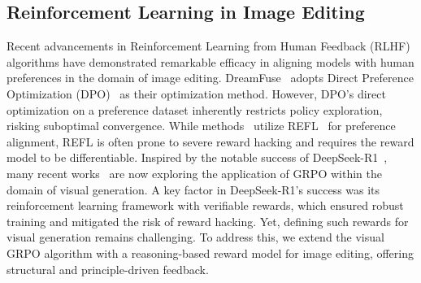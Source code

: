 \subsection{Reinforcement Learning in Image Editing}
Recent advancements in Reinforcement Learning from Human Feedback (RLHF) algorithms have demonstrated remarkable efficacy in aligning models with human preferences in the domain of image editing. 
DreamFuse~\citep{huang2025dreamfuse} adopts Direct Preference Optimization (DPO)~\citep{wallace2024diffusion} as their optimization method. 
However, DPO's direct optimization on a preference dataset inherently restricts policy exploration, risking suboptimal convergence.
While methods~\citep{gong2025onereward,ren2024byteedit} utilize REFL~\citep{xu2023imagereward} for preference alignment, REFL is often prone to severe reward hacking and requires the reward model to be differentiable.
Inspired by the notable success of DeepSeek-R1~\citep{guo2025deepseek}, many recent works~\citep{xue2025dancegrpo, liu2025flow} are now exploring the application of GRPO within the domain of visual generation. 
A key factor in DeepSeek-R1’s success was its reinforcement learning framework with verifiable rewards, which ensured robust training and mitigated the risk of reward hacking. Yet, defining such rewards for visual generation remains challenging. To address this, we extend the visual GRPO algorithm with a reasoning-based reward model for image editing, offering structural and principle-driven feedback.

